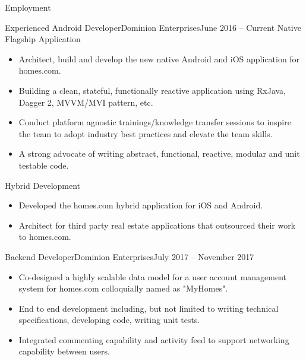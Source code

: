\documentclass{mcdowellcv}
\begin{document}
	\makeheader
	
	\begin{cvsection}{Employment}
		\begin{cvsubsection}{Experienced Android Developer}{Dominion Enterprises}{June 2016 -- Current}
			Native Flagship Application
			\begin{itemize}
				\item Architect, build and develop the new native Android and iOS application for homes.com.
				\item Building a clean, stateful, functionally reactive application using RxJava, Dagger 2, MVVM/MVI pattern, etc.
				\item Conduct platform agnostic trainings/knowledge transfer sessions to inspire the team to adopt industry best practices and elevate the team skills.
				\item A strong advocate of writing abstract, functional, reactive, modular and unit testable code.
			\end{itemize}

			Hybrid Development
			\begin{itemize}
				\item Developed the homes.com hybrid application for iOS and Android.
				\item Architect for third party real estate applications that outsourced their work to homes.com.
			\end{itemize}
		\end{cvsubsection}
		
		\begin{cvsubsection}{Backend Developer}{Dominion Enterprises}{July 2017 -- November 2017}	
			\begin{itemize}
				\item Co-designed a highly scalable data model for a user account management system for homes.com colloquially named as "MyHomes".
				\item End to end development including, but not limited to writing technical specifications, developing code, writing unit tests.
				\item Integrated commenting capability and activity feed to support networking capability between users.
			\end{itemize}
		\end{cvsubsection}
		

\end{cvsection}
\end{document}
